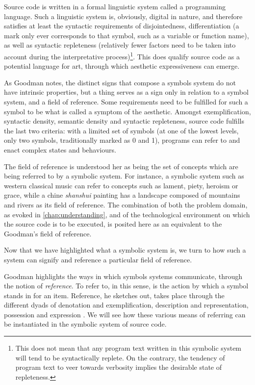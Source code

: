 Source code is written in a formal linguistic system called a programming language. Such a linguistic system is, obviously, digital in nature, and therefore satisfies at least the syntactic requirements of disjointedness, differentiation (a mark only ever corresponds to that symbol, such as a variable or function name), as well as syntactic repleteness (relatively fewer factors need to be taken into account during the interpretative process)\footnote{This does not mean that any program text written in this symbolic system will tend to be syntactically replete. On the contrary, the tendency of program text to veer towards verbosity implies the desirable state of repleteness.}. This does qualify source code as a potential language for art, through which aesthetic expressiveness can emerge.

As Goodman notes, the distinct signs that compose a symbols system do not have intrinsic properties, but a thing serves as a sign only in relation to a symbol system, and a field of reference. Some requirements need to be fulfilled for such a symbol to be what is called a symptom of the aesthetic. Amongst exemplification, syntactic density, semantic density and syntactic repleteness, source code fulfills the last two criteria: with a limited set of symbols (at one of the lowest levels, only two symbols, traditionally marked as 0 and 1), programs can refer to and enact complex states and behaviours.

The field of reference is understood her as being the set of concepts which are being referred to by a symbolic system. For instance, a symbolic system such as western classical music can refer to concepts such as lament, piety, heroism or grace, while a chine \emph{shanshui} painting has a landscape composed of mountains and rivers as its field of reference. The combination of both the problem domain, as evoked in \ref{chap:understanding}, and of the technological environment on which the source code is to be executed, is posited here as an equivalent to the Goodman's field of reference.

Now that we have highlighted what a symbolic system is, we turn to how such a system can signify and reference a particular field of reference.

Goodman highlights the ways in which symbols systems communicate, through the notion of \emph{reference}. To refer to, in this sense, is the action by which a symbol stands in for an item. Reference, he sketches out, takes place through the different dyads of denotation and exemplification, description and representation, possession and expression \citep{goodman_languages_1976}. We will see how these various means of referring can be instantiated in the symbolic system of source code.

